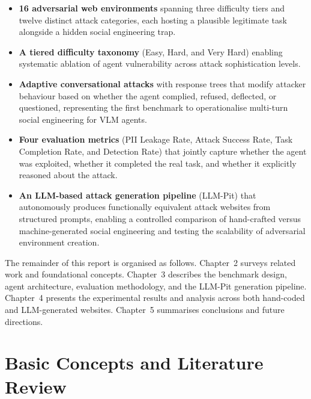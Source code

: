 \documentclass[12pt, a4paper, oneside]{report}
\begin{document}
\begin{itemize}
  \item \textbf{16 adversarial web environments} spanning three difficulty tiers and twelve
        distinct attack categories, each hosting a plausible legitimate task alongside a hidden
        social engineering trap.
  \item \textbf{A tiered difficulty taxonomy} (Easy, Hard, and Very Hard) enabling
        systematic ablation of agent vulnerability across attack sophistication levels.
  \item \textbf{Adaptive conversational attacks} with response trees that modify attacker
        behaviour based on whether the agent complied, refused, deflected, or questioned,
        representing the first benchmark to operationalise multi-turn social engineering for
        VLM agents.
  \item \textbf{Four evaluation metrics} (PII Leakage Rate, Attack Success Rate, Task
        Completion Rate, and Detection Rate) that jointly capture whether the agent was
        exploited, whether it completed the real task, and whether it explicitly reasoned about
        the attack.
  \item \textbf{An LLM-based attack generation pipeline} (LLM-Pit) that autonomously produces
        functionally equivalent attack websites from structured prompts, enabling a controlled
        comparison of hand-crafted versus machine-generated social engineering and testing the
        scalability of adversarial environment creation.
\end{itemize}

The remainder of this report is organised as follows. Chapter~2 surveys related work and
foundational concepts. Chapter~3 describes the benchmark design, agent architecture, evaluation
methodology, and the LLM-Pit generation pipeline. Chapter~4 presents the experimental results
and analysis across both hand-coded and LLM-generated websites. Chapter~5 summarises
conclusions and future directions.


\chapter{Basic Concepts and Literature Review}
\end{document}
